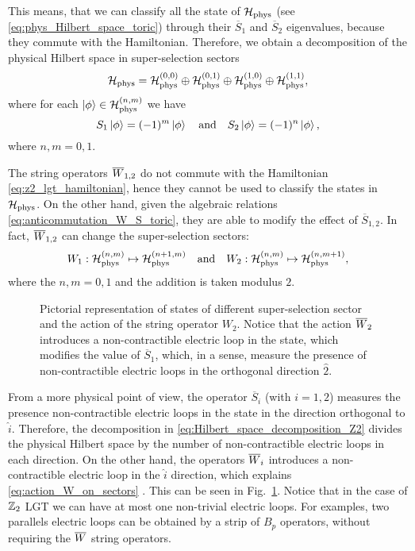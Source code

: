 This means, that we can classify all the state of $\mathcal{H}_{\text{phys}}$ (see \eqref{eq:phys_Hilbert_space_toric}) through their $\overline{S}_1$ and $\overline{S}_2$ eigenvalues, because they commute with the Hamiltonian.
Therefore, we obtain a decomposition of the physical Hilbert space in super-selection sectors
\begin{equation}
    \mathcal{H}_{\text{phys}} = \mathcal{H}_{\text{phys}}^{(0,0)} \oplus \mathcal{H}_{\text{phys}}^{(0,1)} \oplus \mathcal{H}_{\text{phys}}^{(1,0)} \oplus \mathcal{H}_{\text{phys}}^{(1,1)},
    \label{eq:Hilbert_space_decomposition_Z2}
\end{equation}
where for each $\ket{\phi} \in \mathcal{H}_{\text{phys}}^{(n,m)}$ we have
\begin{equation}
    S_1 \ket{\phi} = (-1)^{m} \ket{\phi}
    \qand
    S_2 \ket{\phi} = (-1)^{n} \ket{\phi},
\end{equation}
where $n, m = 0, 1$.

The string operators $\overline{W}_{1,2}$ do not commute with the Hamiltonian \eqref{eq:z2_lgt_hamiltonian}, hence they cannot be used to classify the states in $\mathcal{H}_{\text{phys}}$.
On the other hand, given the algebraic relations \eqref{eq:anticommutation_W_S_toric}, they are able to modify the effect of $\overline{S}_{1,2}$.
In fact, $\overline{W}_{1,2}$ can change the super-selection sectors:
\begin{equation}
    W_1 : \Hphys^{(n,m)} \mapsto \Hphys^{(n+1,m)}
    \qand
    W_2 : \Hphys^{(n,m)} \mapsto \Hphys^{(n,m+1)},
    \label{eq:action_W_on_sectors}
\end{equation}
where the $n,m = 0, 1$ and the addition is taken modulus $2$.


\begin{figure}[t]
    \centering
    
    \vspace*{-0.5cm}
    \caption{%
        Pictorial representation of states of different super-selection sector and the action of the string operator $W_2$.
        Notice that the action $\overline{W}_2$ introduces a non-contractible electric loop in the state, which modifies the value of $\overline{S}_1$, which, in a sense, measure the presence of non-contractible electric loops in the orthogonal direction $\hat{2}$.%
        }
    \label{fig:sector_mapping}
\end{figure}

From a more physical point of view, the operator $\overline{S}_i$ (with $i=1,2$) measures the presence non-contractible electric loops in the state in the direction orthogonal to $\hat{i}$.
Therefore, the decomposition in \eqref{eq:Hilbert_space_decomposition_Z2} divides the physical Hilbert space by the number of non-contractible electric loops in each direction.
On the other hand, the operators $\overline{W}_i$ introduces a non-contractible electric loop in the $\hat{i}$ direction, which explains \eqref{eq:action_W_on_sectors} .
This can be seen in Fig.~\ref{fig:sector_mapping}.
Notice that in the case of $\mathbb{Z}_2$ LGT we can have at most one non-trivial electric loops.
For examples, two parallels electric loops can be obtained by a strip of $B_p$ operators, without requiring the $\overline{W}$ string operators.
